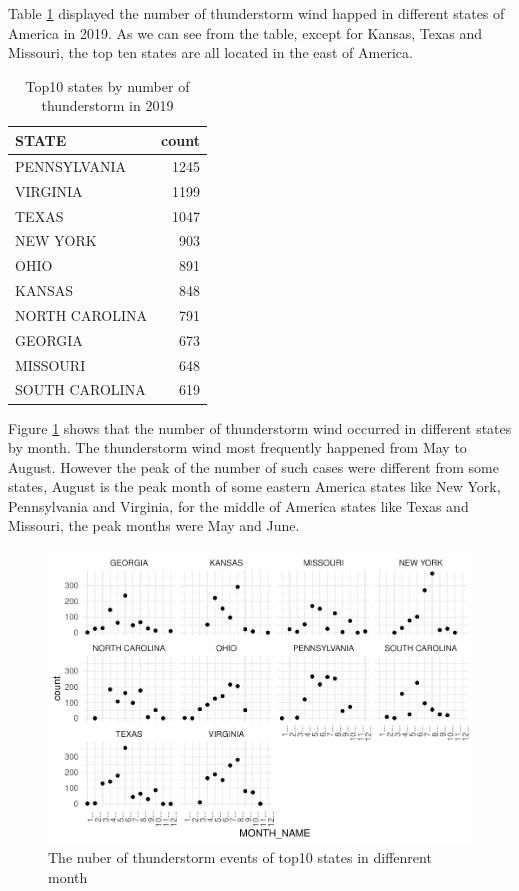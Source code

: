 \documentclass[
]{article}
\begin{document}
\clearpage

Table \ref{tab:statestb} displayed the number of thunderstorm wind happed in different states of America in 2019. As we can see from the table, except for Kansas, Texas and Missouri, the top ten states are all located in the east of America.

\begin{table}[!h]

\caption{\label{tab:statestb}Top10 states by number of thunderstorm in 2019}
\centering
\begin{tabular}[t]{l|r}
\hline
STATE & count\\
\hline
PENNSYLVANIA & 1245\\
\hline
VIRGINIA & 1199\\
\hline
TEXAS & 1047\\
\hline
NEW YORK & 903\\
\hline
OHIO & 891\\
\hline
KANSAS & 848\\
\hline
NORTH CAROLINA & 791\\
\hline
GEORGIA & 673\\
\hline
MISSOURI & 648\\
\hline
SOUTH CAROLINA & 619\\
\hline
\end{tabular}
\end{table}

Figure \ref{fig:monthplot} shows that the number of thunderstorm wind occurred in different states by month. The thunderstorm wind most frequently happened from May to August. However the peak of the number of such cases were different from some states, August is the peak month of some eastern America states like New York, Pennsylvania and Virginia, for the middle of America states like Texas and Missouri, the peak months were May and June.

\begin{figure}

{\centering \includegraphics{Images/monthplot-1} 

}

\caption{The nuber of thunderstorm events of top10 states in diffenrent month}\label{fig:monthplot}
\end{figure}
\end{document}
